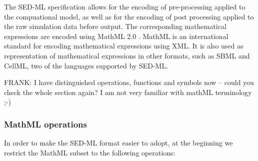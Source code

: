 \label{sec:mathML}
The SED-ML specification allows for the encoding of pre-processing applied to the compuational model,  as well as for the encoding of post processing applied to the raw simulation data before output. 
The corresponding mathematical expressions are encoded using MathML 2.0 \citep{CIM+01}. MathML is an international standard for encoding mathematical expressions using XML. It is also used as representation of mathematical expressions in other formats, such as SBML and CellML, two of the languages supported by SED-ML. 

\alert{FRANK: I have distinguished operations, functions and symbols now -- could you check the whole section again? I am not very familiar with mathML terminology ;-)}

\subsubsection{MathML operations}
In order to make the SED-ML format easier to adopt, at the beginning we restrict the MathML subset to the following operations: 

